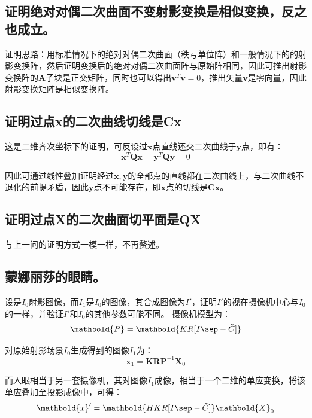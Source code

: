 \documentclass[11pt]{article}
\begin{document}
\subsection{证明绝对对偶二次曲面不变射影变换是相似变换，反之也成立。}
证明思路：用标准情况下的绝对对偶二次曲面（秩亏单位阵）和一般情况下的的射影变换阵，然后证明变换后的绝对对偶二次曲面阵与原始阵相同，因此可推出射影变换阵的$\mathbf{A}$子块是正交矩阵，同时也可以得出$\mathbf{v}^T\mathbf{v}=0$，推出矢量$\mathbf{v}$是零向量，因此射影变换矩阵是相似变换阵。
\subsection{证明过点x的二次曲线切线是Cx}
这是二维齐次坐标下的证明，可反设过$\mathbf{x}$点直线还交二次曲线于$\mathbf{y}$点，即有：
\begin{equation*}
  \mathbf{x}^T\mathbf{Qx}=\mathbf{y}^T\mathbf{Qy}=0
\end{equation*}\par
因此可通过线性叠加证明经过$\mathbf{x,y}$的全部点的直线都在二次曲线上，与二次曲线不退化的前提矛盾，因此$\mathbf{y}$点不可能存在，即$\mathbf{x}$点的切线是$\mathbf{Cx}$。
\subsection{证明过点X的二次曲面切平面是QX}
与上一问的证明方式一模一样，不再赘述。
\subsection{蒙娜丽莎的眼睛。}
{\heiti 设是$I_0$射影图像，而$I_1$是$I_0$的图像，其合成图像为$I'$，证明$I'$的视在摄像机中心与$I_0$的一样，并验证$I'$和$I_0$的其他参数可能不同。}
摄像机模型为：
\begin{equation*}
  \mathbold{P}=\mathbold{KR[I\sep -\tilde{C}]}
\end{equation*}\par
对原始射影场景$I_0$生成得到的图像$I_1$为：
\begin{equation*}
  \mathbold{x}_1=\mathbold{KRP}^{-1}\mathbold{X}_0
\end{equation*}\par
而人眼相当于另一套摄像机，其对图像$I_1$成像，相当于一个二维的单应变换，将该单应叠加至投影成像中，可得：
\begin{equation*}
  \mathbold{x}'=\mathbold{HKR[I\sep -\tilde{C}]}\mathbold{X}_0
\end{equation*}\par
\end{document}
